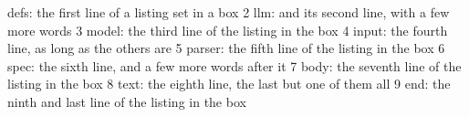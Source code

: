 \noindent\begin{minipage}{\linewidth}
\obeylines{} defs: the first line of a listing set in a box
2 llm: and its second line, with a few more words
3 model: the third line of the listing in the box
4 input: the fourth line, as long as the others are
5 parser: the fifth line of the listing in the box
6 spec: the sixth line, and a few more words after it
7 body: the seventh line of the listing in the box
8 text: the eighth line, the last but one of them all
9 end: the ninth and last line of the listing in the box
\end{minipage}
